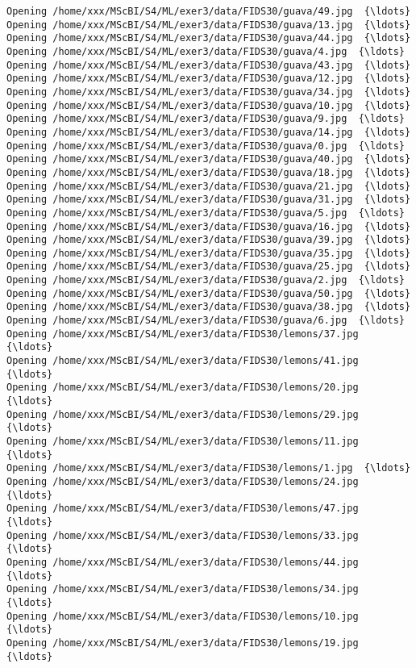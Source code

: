 \documentclass[11pt]{article}
\begin{document}
\begin{Verbatim}[commandchars=\\\{\}]
Opening /home/xxx/MScBI/S4/ML/exer3/data/FIDS30/guava/49.jpg  {\ldots}
Opening /home/xxx/MScBI/S4/ML/exer3/data/FIDS30/guava/13.jpg  {\ldots}
Opening /home/xxx/MScBI/S4/ML/exer3/data/FIDS30/guava/44.jpg  {\ldots}
Opening /home/xxx/MScBI/S4/ML/exer3/data/FIDS30/guava/4.jpg  {\ldots}
Opening /home/xxx/MScBI/S4/ML/exer3/data/FIDS30/guava/43.jpg  {\ldots}
Opening /home/xxx/MScBI/S4/ML/exer3/data/FIDS30/guava/12.jpg  {\ldots}
Opening /home/xxx/MScBI/S4/ML/exer3/data/FIDS30/guava/34.jpg  {\ldots}
Opening /home/xxx/MScBI/S4/ML/exer3/data/FIDS30/guava/10.jpg  {\ldots}
Opening /home/xxx/MScBI/S4/ML/exer3/data/FIDS30/guava/9.jpg  {\ldots}
Opening /home/xxx/MScBI/S4/ML/exer3/data/FIDS30/guava/14.jpg  {\ldots}
Opening /home/xxx/MScBI/S4/ML/exer3/data/FIDS30/guava/0.jpg  {\ldots}
Opening /home/xxx/MScBI/S4/ML/exer3/data/FIDS30/guava/40.jpg  {\ldots}
Opening /home/xxx/MScBI/S4/ML/exer3/data/FIDS30/guava/18.jpg  {\ldots}
Opening /home/xxx/MScBI/S4/ML/exer3/data/FIDS30/guava/21.jpg  {\ldots}
Opening /home/xxx/MScBI/S4/ML/exer3/data/FIDS30/guava/31.jpg  {\ldots}
Opening /home/xxx/MScBI/S4/ML/exer3/data/FIDS30/guava/5.jpg  {\ldots}
Opening /home/xxx/MScBI/S4/ML/exer3/data/FIDS30/guava/16.jpg  {\ldots}
Opening /home/xxx/MScBI/S4/ML/exer3/data/FIDS30/guava/39.jpg  {\ldots}
Opening /home/xxx/MScBI/S4/ML/exer3/data/FIDS30/guava/35.jpg  {\ldots}
Opening /home/xxx/MScBI/S4/ML/exer3/data/FIDS30/guava/25.jpg  {\ldots}
Opening /home/xxx/MScBI/S4/ML/exer3/data/FIDS30/guava/2.jpg  {\ldots}
Opening /home/xxx/MScBI/S4/ML/exer3/data/FIDS30/guava/50.jpg  {\ldots}
Opening /home/xxx/MScBI/S4/ML/exer3/data/FIDS30/guava/38.jpg  {\ldots}
Opening /home/xxx/MScBI/S4/ML/exer3/data/FIDS30/guava/6.jpg  {\ldots}
Opening /home/xxx/MScBI/S4/ML/exer3/data/FIDS30/lemons/37.jpg  {\ldots}
Opening /home/xxx/MScBI/S4/ML/exer3/data/FIDS30/lemons/41.jpg  {\ldots}
Opening /home/xxx/MScBI/S4/ML/exer3/data/FIDS30/lemons/20.jpg  {\ldots}
Opening /home/xxx/MScBI/S4/ML/exer3/data/FIDS30/lemons/29.jpg  {\ldots}
Opening /home/xxx/MScBI/S4/ML/exer3/data/FIDS30/lemons/11.jpg  {\ldots}
Opening /home/xxx/MScBI/S4/ML/exer3/data/FIDS30/lemons/1.jpg  {\ldots}
Opening /home/xxx/MScBI/S4/ML/exer3/data/FIDS30/lemons/24.jpg  {\ldots}
Opening /home/xxx/MScBI/S4/ML/exer3/data/FIDS30/lemons/47.jpg  {\ldots}
Opening /home/xxx/MScBI/S4/ML/exer3/data/FIDS30/lemons/33.jpg  {\ldots}
Opening /home/xxx/MScBI/S4/ML/exer3/data/FIDS30/lemons/44.jpg  {\ldots}
Opening /home/xxx/MScBI/S4/ML/exer3/data/FIDS30/lemons/34.jpg  {\ldots}
Opening /home/xxx/MScBI/S4/ML/exer3/data/FIDS30/lemons/10.jpg  {\ldots}
Opening /home/xxx/MScBI/S4/ML/exer3/data/FIDS30/lemons/19.jpg  {\ldots}

\end{Verbatim}
\end{document}
